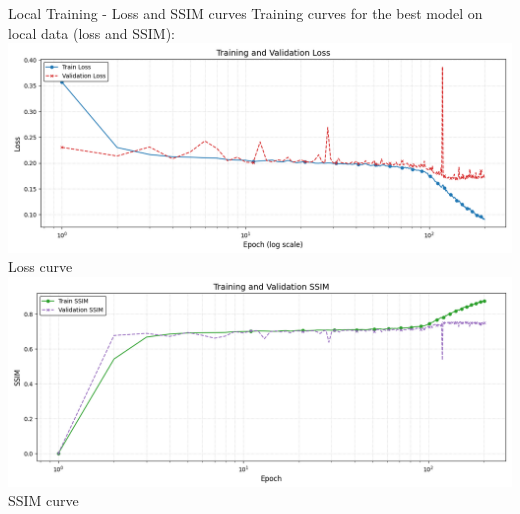 \documentclass[8pt]{beamer}
\begin{document}
\begin{frame}[fragile]{Local Training - Loss and SSIM curves}
    Training curves for the best model on local data (loss and SSIM):
    \newline
    \includegraphics[width=0.7\linewidth]{images/local_loss_curve.png}
    \newline
    \small Loss curve 
    \newline
    \includegraphics[width=0.7\linewidth]{images/local_ssim_curve.png}
    \newline
    \small SSIM curve 
\end{frame}
\end{document}
